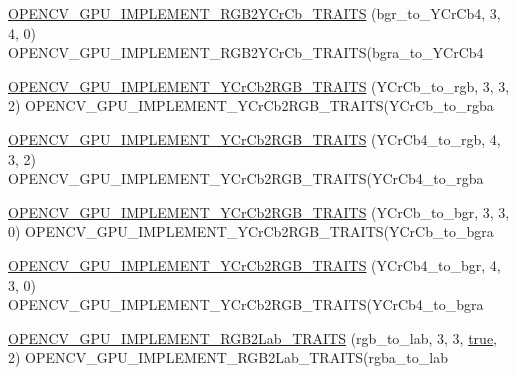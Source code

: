 \begin{DoxyCompactItemize}
\item 
\hyperlink{namespacecv_1_1gpu_1_1device_a207b4ab35932a3aa3e1ac2619f3d6b7c}{O\-P\-E\-N\-C\-V\-\_\-\-G\-P\-U\-\_\-\-I\-M\-P\-L\-E\-M\-E\-N\-T\-\_\-\-R\-G\-B2\-Y\-Cr\-Cb\-\_\-\-T\-R\-A\-I\-T\-S} (bgr\-\_\-to\-\_\-\-Y\-Cr\-Cb4, 3, 4, 0) O\-P\-E\-N\-C\-V\-\_\-\-G\-P\-U\-\_\-\-I\-M\-P\-L\-E\-M\-E\-N\-T\-\_\-\-R\-G\-B2\-Y\-Cr\-Cb\-\_\-\-T\-R\-A\-I\-T\-S(bgra\-\_\-to\-\_\-\-Y\-Cr\-Cb4
\item 
\hyperlink{namespacecv_1_1gpu_1_1device_a5d07afb228b6d72e9b9ff9ec2cd13b5f}{O\-P\-E\-N\-C\-V\-\_\-\-G\-P\-U\-\_\-\-I\-M\-P\-L\-E\-M\-E\-N\-T\-\_\-\-Y\-Cr\-Cb2\-R\-G\-B\-\_\-\-T\-R\-A\-I\-T\-S} (Y\-Cr\-Cb\-\_\-to\-\_\-rgb, 3, 3, 2) O\-P\-E\-N\-C\-V\-\_\-\-G\-P\-U\-\_\-\-I\-M\-P\-L\-E\-M\-E\-N\-T\-\_\-\-Y\-Cr\-Cb2\-R\-G\-B\-\_\-\-T\-R\-A\-I\-T\-S(Y\-Cr\-Cb\-\_\-to\-\_\-rgba
\item 
\hyperlink{namespacecv_1_1gpu_1_1device_a2b5c8fedc718aea529a5de9d55e2ef00}{O\-P\-E\-N\-C\-V\-\_\-\-G\-P\-U\-\_\-\-I\-M\-P\-L\-E\-M\-E\-N\-T\-\_\-\-Y\-Cr\-Cb2\-R\-G\-B\-\_\-\-T\-R\-A\-I\-T\-S} (Y\-Cr\-Cb4\-\_\-to\-\_\-rgb, 4, 3, 2) O\-P\-E\-N\-C\-V\-\_\-\-G\-P\-U\-\_\-\-I\-M\-P\-L\-E\-M\-E\-N\-T\-\_\-\-Y\-Cr\-Cb2\-R\-G\-B\-\_\-\-T\-R\-A\-I\-T\-S(Y\-Cr\-Cb4\-\_\-to\-\_\-rgba
\item 
\hyperlink{namespacecv_1_1gpu_1_1device_abfa5342e2c8cf7b0908259724370c305}{O\-P\-E\-N\-C\-V\-\_\-\-G\-P\-U\-\_\-\-I\-M\-P\-L\-E\-M\-E\-N\-T\-\_\-\-Y\-Cr\-Cb2\-R\-G\-B\-\_\-\-T\-R\-A\-I\-T\-S} (Y\-Cr\-Cb\-\_\-to\-\_\-bgr, 3, 3, 0) O\-P\-E\-N\-C\-V\-\_\-\-G\-P\-U\-\_\-\-I\-M\-P\-L\-E\-M\-E\-N\-T\-\_\-\-Y\-Cr\-Cb2\-R\-G\-B\-\_\-\-T\-R\-A\-I\-T\-S(Y\-Cr\-Cb\-\_\-to\-\_\-bgra
\item 
\hyperlink{namespacecv_1_1gpu_1_1device_ae24af364cc05e7eeabacff07080a68bb}{O\-P\-E\-N\-C\-V\-\_\-\-G\-P\-U\-\_\-\-I\-M\-P\-L\-E\-M\-E\-N\-T\-\_\-\-Y\-Cr\-Cb2\-R\-G\-B\-\_\-\-T\-R\-A\-I\-T\-S} (Y\-Cr\-Cb4\-\_\-to\-\_\-bgr, 4, 3, 0) O\-P\-E\-N\-C\-V\-\_\-\-G\-P\-U\-\_\-\-I\-M\-P\-L\-E\-M\-E\-N\-T\-\_\-\-Y\-Cr\-Cb2\-R\-G\-B\-\_\-\-T\-R\-A\-I\-T\-S(Y\-Cr\-Cb4\-\_\-to\-\_\-bgra
\item 
\hyperlink{namespacecv_1_1gpu_1_1device_ad9a94b0dea8c866e42f59057f687e0d0}{O\-P\-E\-N\-C\-V\-\_\-\-G\-P\-U\-\_\-\-I\-M\-P\-L\-E\-M\-E\-N\-T\-\_\-\-R\-G\-B2\-Lab\-\_\-\-T\-R\-A\-I\-T\-S} (rgb\-\_\-to\-\_\-lab, 3, 3, \hyperlink{namespacecv_1_1gpu_1_1device_ac34c172a7a1904fb0fd477321a31f926}{true}, 2) O\-P\-E\-N\-C\-V\-\_\-\-G\-P\-U\-\_\-\-I\-M\-P\-L\-E\-M\-E\-N\-T\-\_\-\-R\-G\-B2\-Lab\-\_\-\-T\-R\-A\-I\-T\-S(rgba\-\_\-to\-\_\-lab
\item 

\end{DoxyCompactItemize}
